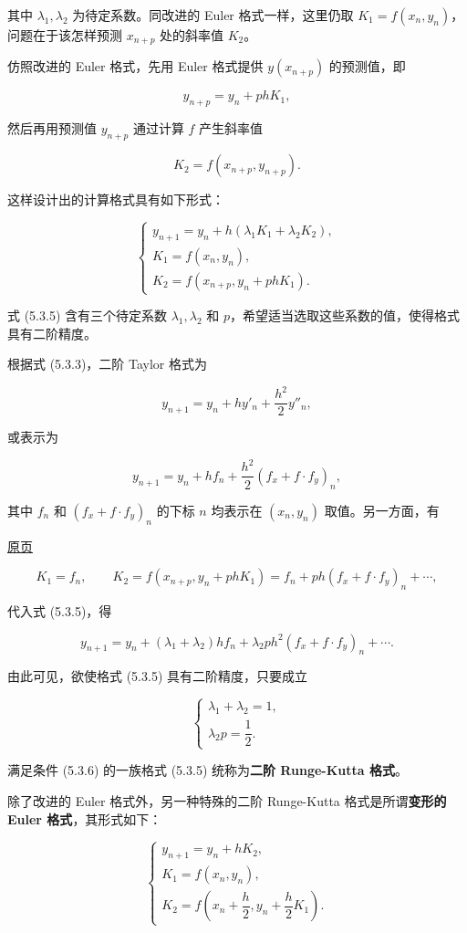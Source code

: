 \documentclass[
  10pt,
  fontset=fandol]{ctexart}
\begin{document}
其中 \(\lambda_1,\lambda_2\) 为待定系数。同改进的 Euler 格式一样，这里仍取 \(K_1=f(x_n,y_n)\)，问题在于该怎样预测 \(x_{n+p}\) 处的斜率值 \(K_2\)。

仿照改进的 Euler 格式，先用 Euler 格式提供 \(y(x_{n+p})\) 的预测值，即

\[
y_{n+p}=y_n+phK_1,
\]

然后再用预测值 \(y_{n+p}\) 通过计算 \(f\) 产生斜率值

\[
K_2=f(x_{n+p},y_{n+p}).
\]

这样设计出的计算格式具有如下形式：

\[
\begin{cases}
y_{n+1}=y_n+h(\lambda_1K_1+\lambda_2K_2),\\
K_1=f(x_n,y_n),\\
K_2=f(x_{n+p},y_n+phK_1).
\end{cases}\tag{5.3.5}
\]

式 (5.3.5) 含有三个待定系数 \(\lambda_1,\lambda_2\) 和 \(p\)，希望适当选取这些系数的值，使得格式具有二阶精度。

根据式 (5.3.3)，二阶 Taylor 格式为

\[
y_{n+1}=y_n+hy'_n+\frac{h^2}{2}y''_n,
\]

或表示为

\[
y_{n+1}=y_n+hf_n+\frac{h^2}{2}(f_x+f\cdot f_y)_n,
\]

其中 \(f_n\) 和 \((f_x+f\cdot f_y)_n\) 的下标 \(n\) 均表示在 \((x_n,y_n)\) 取值。另一方面，有

\href{../../source-images/pdf-129.jpeg}{原页}

\[
K_1=f_n,\qquad K_2=f(x_{n+p},y_n+phK_1)=f_n+ph(f_x+f\cdot f_y)_n+\cdots,
\]

代入式 (5.3.5)，得

\[
y_{n+1}=y_n+(\lambda_1+\lambda_2)hf_n+\lambda_2ph^2(f_x+f\cdot f_y)_n+\cdots.
\]

由此可见，欲使格式 (5.3.5) 具有二阶精度，只要成立

\[
\begin{cases}
\lambda_1+\lambda_2=1,\\
\lambda_2p=\dfrac{1}{2}.
\end{cases}\tag{5.3.6}
\]

满足条件 (5.3.6) 的一族格式 (5.3.5) 统称为\textbf{二阶 Runge-Kutta 格式}。

除了改进的 Euler 格式外，另一种特殊的二阶 Runge-Kutta 格式是所谓\textbf{变形的 Euler 格式}，其形式如下：

\[
\begin{cases}
y_{n+1}=y_n+hK_2,\\
K_1=f(x_n,y_n),\\
K_2=f\left(x_n+\dfrac{h}{2},y_n+\dfrac{h}{2}K_1\right).
\end{cases}
\]
\end{document}
